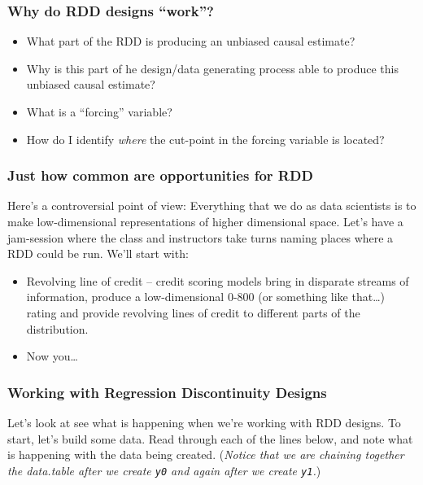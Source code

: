 \documentclass[
]{article}
\theoremstyle{definition}
\theoremstyle{definition}
\theoremstyle{definition}
\theoremstyle{definition}
\theoremstyle{remark}
\begin{document}
\subsubsection{Why do RDD designs ``work''?}\label{why-do-rdd-designs-work}

\begin{itemize}
\item
  What part of the RDD is producing an unbiased causal estimate?
\item
  Why is this part of he design/data generating process able to produce this unbiased causal estimate?
\item
  What is a ``forcing'' variable?
\item
  How do I identify \emph{where} the cut-point in the forcing variable is located?
\end{itemize}

\subsubsection{Just how common are opportunities for RDD}\label{just-how-common-are-opportunities-for-rdd}

Here's a controversial point of view: Everything that we do as data scientists is to make low-dimensional representations of higher dimensional space. Let's have a jam-session where the class and instructors take turns naming places where a RDD could be run. We'll start with:

\begin{itemize}
\item
  Revolving line of credit -- credit scoring models bring in disparate streams of information, produce a low-dimensional 0-800 (or something like that\ldots) rating and provide revolving lines of credit to different parts of the distribution.
\item
  Now you\ldots{}
\end{itemize}

\subsubsection{Working with Regression Discontinuity Designs}\label{working-with-regression-discontinuity-designs}

Let's look at see what is happening when we're working with RDD designs. To start, let's build some data. Read through each of the lines below, and note what is happening with the data being created. (\emph{Notice that we are chaining together the data.table after we create \texttt{y0} and again after we create \texttt{y1}.})
\end{document}
